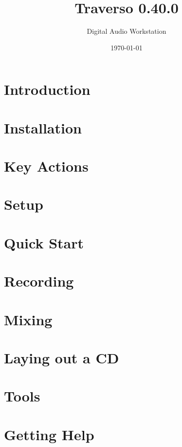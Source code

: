 \documentclass[a4paper,
               12pt,
               pdftex,
               twoside,
               smallheadings,
               headsepline,
               headinclude,
               DIV16,
               BCOR10mm
               ]{scrreprt}
\newcommand{\clearemptydoublepage}{\newpage\pagestyle{empty}\cleardoublepage}
\begin{document}
\title{Traverso 0.40.0}
\author{Digital Audio Workstation}
\date{\today}

\begin{titlepage}
  
\end{titlepage}
  \clearemptydoublepage
  



\tableofcontents


\chapter{Introduction\label{sect_introduction}}

\chapter{Installation\label{sect_installation}}

\chapter{Key Actions\label{sect_keyactions}}

\chapter{Setup\label{sect_setup}}

\chapter{Quick Start\label{sect_quickstart}}

\chapter{Recording\label{sect_recording}}

\chapter{Mixing\label{sect_mixing}}

\chapter{Laying out a CD\label{sect_cdburning}}

\chapter{Tools\label{sect_tools}}

\chapter{Getting Help\label{sect_help}}

\end{document}
